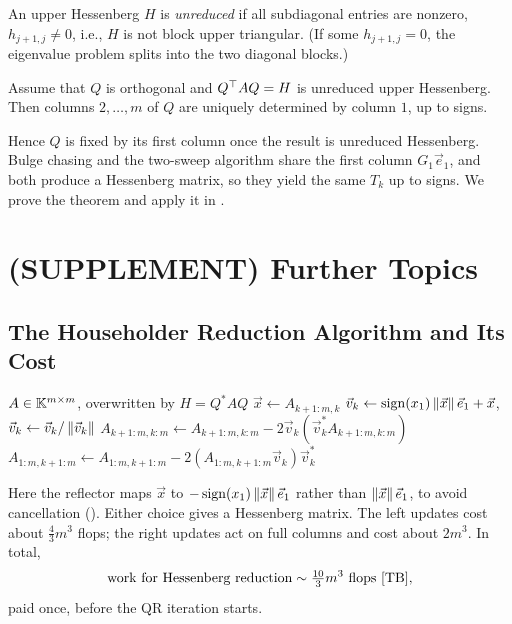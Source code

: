 An upper Hessenberg $H$ is \emph{unreduced} if all subdiagonal entries are nonzero, $h_{j+1,j} \ne 0$, i.e., $H$ is not block upper triangular. (If some $h_{j+1,j} = 0$, the eigenvalue problem splits into the two diagonal blocks.)

\begin{theorem}
  \label{thm:implicit-q}
  Assume that $Q$ is orthogonal and $Q^\top AQ = H$ is unreduced upper Hessenberg. Then columns $2, \dots, m$ of $Q$ are uniquely determined by column $1$, up to signs.
\end{theorem}

Hence $Q$ is fixed by its first column once the result is unreduced Hessenberg. Bulge chasing and the two-sweep algorithm share the first column $G_1\vec{e}_1$, and both produce a Hessenberg matrix, so they yield the same $T_k$ up to signs. We prove the theorem and apply it in .

\section{(SUPPLEMENT) Further Topics}
\label{sec:hessenberg-supp}

\subsection{The Householder Reduction Algorithm and Its Cost}

\begin{algorithm}[H]
  \caption{Householder reduction to Hessenberg form~\cite[Algorithm 26.1]{TB}.}
  \label{alg:hessenberg}
  \begin{algorithmic}[1]
    \Require $A \in \mathbb{K}^{m \times m}$, overwritten by $H = Q^\ast AQ$
      \State $\vec{x} \gets A_{k+1:m,k}$
      \State $\vec{v}_k \gets \operatorname{sign}(x_1)\left\lVert \vec{x} \right\rVert\vec{e}_1 + \vec{x}$, \quad $\vec{v}_k \gets \vec{v}_k/\left\lVert \vec{v}_k \right\rVert$
      \State $A_{k+1:m,k:m} \gets A_{k+1:m,k:m} - 2\vec{v}_k(\vec{v}_k^\ast A_{k+1:m,k:m})$ 
      \State $A_{1:m,k+1:m} \gets A_{1:m,k+1:m} - 2(A_{1:m,k+1:m}\vec{v}_k)\vec{v}_k^\ast$ 
    \EndFor
  \end{algorithmic}
\end{algorithm}

Here the reflector maps $\vec{x}$ to $-\operatorname{sign}(x_1)\left\lVert \vec{x} \right\rVert\vec{e}_1$ rather than $\left\lVert \vec{x} \right\rVert\vec{e}_1$, to avoid cancellation (). Either choice gives a Hessenberg matrix. The left updates cost about $\tfrac{4}{3}m^3$ flops; the right updates act on full columns and cost about $2m^3$. In total,
\begin{equation}
  \text{work for Hessenberg reduction} \sim \tfrac{10}{3}m^3 \text{ flops}~\cite[(26.1)]{TB},
\end{equation}
paid once, before the QR iteration starts.


